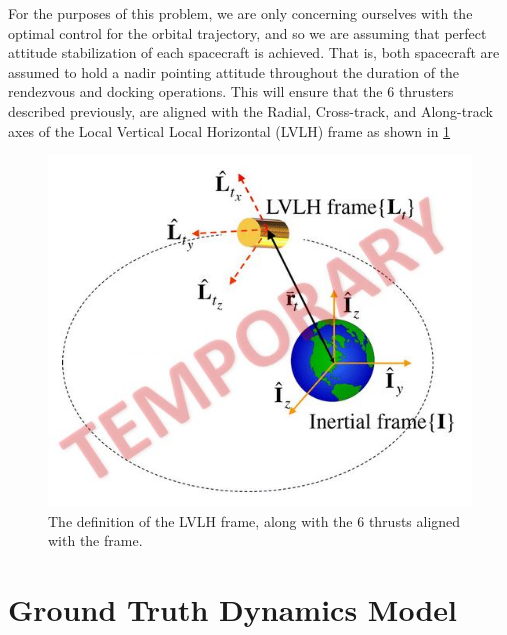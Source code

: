 \documentclass[conf]{new-aiaa}
\begin{document}
For the purposes of this problem, we are only concerning ourselves with the optimal control for the orbital trajectory, and so we are assuming that perfect attitude stabilization of each spacecraft is achieved.  That is, both spacecraft are assumed to hold a nadir pointing attitude throughout the duration of the rendezvous and docking operations.  This will ensure that the 6 thrusters described previously, are aligned with the Radial, Cross-track, and Along-track axes of the Local Vertical Local Horizontal (LVLH) frame as shown in \ref{fig:lvlh}
\begin{figure}[H]
    \centering
    \includegraphics[width=.5\textwidth]{lvlh.JPG}
    \caption{The definition of the LVLH frame, along with the 6 thrusts aligned with the frame.}
    \label{fig:lvlh}
\end{figure}




\section{Ground Truth Dynamics Model}
\end{document}
